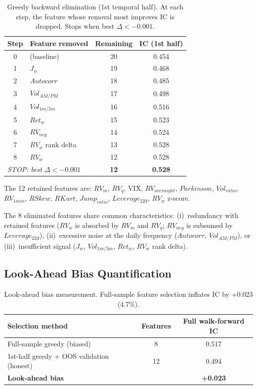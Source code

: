 \documentclass[11pt,a4paper]{article}
\begin{document}
\begin{table}[H]
\centering
\caption{Greedy backward elimination (1st temporal half). At each step, the feature whose removal most improves IC is dropped. Stops when best $\Delta < -0.001$.}
\label{tab:greedy}
\begin{tabular}{c l c c}
\toprule
\textbf{Step} & \textbf{Feature removed} & \textbf{Remaining} & \textbf{IC (1st half)} \\
\midrule
0 & (baseline) & 20 & 0.454 \\
1 & $J_w$ & 19 & 0.468 \\
2 & $Autocorr$ & 18 & 0.485 \\
3 & $Vol_{AM/PM}$ & 17 & 0.498 \\
4 & $Vol_{1m/5m}$ & 16 & 0.516 \\
5 & $Ret_w$ & 15 & 0.523 \\
6 & $RV_{neg}$ & 14 & 0.524 \\
7 & $RV_w$ rank delta & 13 & 0.528 \\
8 & $RV_w$ & 12 & 0.528 \\
\midrule
\multicolumn{2}{l}{\textit{STOP: best $\Delta < -0.001$}} & \textbf{12} & \textbf{0.528} \\
\bottomrule
\end{tabular}
\end{table}

The 12 retained features are: $RV_m$, $RV_q$, VIX, $RV_{overnight}$, $Parkinson$, $Vol_{ratio}$, $RV_{1min}$, $RSkew$, $RKurt$, $Jump_{ratio}$, $Leverage_{22d}$, $RV_w$ z-score.

The 8 eliminated features share common characteristics: (i)~redundancy with retained features ($RV_w$ is absorbed by $RV_m$ and $RV_q$; $RV_{neg}$ is subsumed by $Leverage_{22d}$), (ii)~excessive noise at the daily frequency ($Autocorr$, $Vol_{AM/PM}$), or (iii)~insufficient signal ($J_w$, $Vol_{1m/5m}$, $Ret_w$, $RV_w$ rank delta).

\subsection{Look-Ahead Bias Quantification}

\begin{table}[H]
\centering
\caption{Look-ahead bias measurement. Full-sample feature selection inflates IC by +0.023 (4.7\%).}
\label{tab:bias}
\begin{tabular}{l c c}
\toprule
\textbf{Selection method} & \textbf{Features} & \textbf{Full walk-forward IC} \\
\midrule
Full-sample greedy (biased) & 8 & 0.517 \\
1st-half greedy + OOS validation (honest) & 12 & 0.494 \\
\midrule
\textbf{Look-ahead bias} & & \textbf{+0.023} \\
\bottomrule
\end{tabular}
\end{table}
\end{document}
